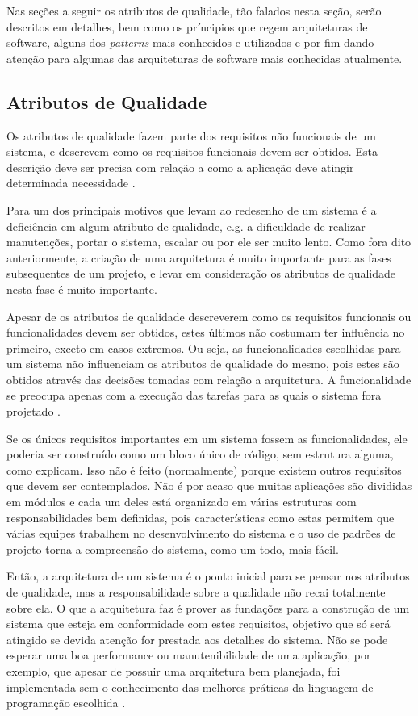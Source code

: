 \documentclass[diss]{template/setrem}
\begin{document}
Nas seções a seguir os atributos de qualidade, tão falados nesta seção, serão descritos em detalhes, bem como os príncipios que regem arquiteturas de software, alguns dos \emph{patterns} mais conhecidos e utilizados e por fim dando atenção para algumas das arquiteturas de software mais conhecidas atualmente.

\subsection{Atributos de Qualidade}
Os atributos de qualidade fazem parte dos requisitos não funcionais de um sistema, e descrevem como os requisitos funcionais devem ser obtidos. Esta descrição deve ser precisa com relação a como a aplicação deve atingir determinada necessidade \citep{Gorton2011}.

Para \citet{Bass2003} um dos principais motivos que levam ao redesenho de um sistema é a deficiência em algum atributo de qualidade, e.g. a dificuldade de realizar manutenções, portar o sistema, escalar ou por ele ser muito lento. Como fora dito anteriormente, a criação de uma arquitetura é muito importante para as fases subsequentes de um projeto, e levar em consideração os atributos de qualidade nesta fase é muito importante.

Apesar de os atributos de qualidade descreverem como os requisitos funcionais ou funcionalidades devem ser obtidos, estes últimos não costumam ter influência no primeiro, exceto em casos extremos. Ou seja, as funcionalidades escolhidas para um sistema não influenciam os atributos de qualidade do mesmo, pois estes são obtidos através das decisões tomadas com relação a arquitetura. A funcionalidade se preocupa apenas com a execução das tarefas para as quais o sistema fora projetado \citep{Bass2003}.

Se os únicos requisitos importantes em um sistema fossem as funcionalidades, ele poderia ser construído como um bloco único de código, sem estrutura alguma, como \citet{Bass2003} explicam. Isso não é feito (normalmente) porque existem outros requisitos que devem ser contemplados. Não é por acaso que muitas aplicações são divididas em módulos e cada um deles está organizado em várias estruturas com responsabilidades bem definidas, pois características como estas permitem que várias equipes trabalhem no desenvolvimento do sistema e o uso de padrões de projeto torna a compreensão do sistema, como um todo, mais fácil.

Então, a arquitetura de um sistema é o ponto inicial para se pensar nos atributos de qualidade, mas a responsabilidade sobre a qualidade não recai totalmente sobre ela. O que a arquitetura faz é prover as fundações para a construção de um sistema que esteja em conformidade com estes requisitos, objetivo que só será atingido se devida atenção for prestada aos detalhes do sistema. Não se pode esperar uma boa performance ou manutenibilidade de uma aplicação, por exemplo, que apesar de possuir uma arquitetura bem planejada, foi implementada sem o conhecimento das melhores práticas da linguagem de programação escolhida \citep{Bass2003}.
\end{document}
